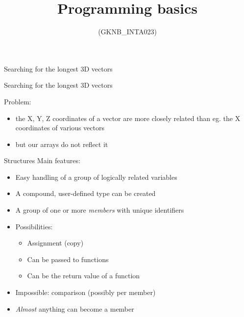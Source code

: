 \documentclass[usenames,dvipsnames,aspectratio=169]{beamer}
\title[Lecture 7.]{Programming basics}
\subtitle{(GKNB\_INTA023)}
\begin{document}
\begin{frame}[plain]
  \titlepage
\end{frame}

\begin{frame}{Searching for the longest 3D vectors}
  \begin{exampleblock}{}
    \scriptsize
    
  \end{exampleblock}
\end{frame}

\begin{frame}{Searching for the longest 3D vectors}
  \begin{exampleblock}{}
    \scriptsize
    
  \end{exampleblock}
  \vfill
  Problem:
  \begin{itemize}
    \item the X, Y, Z coordinates of a vector are more closely related than eg. the X coordinates of various vectors
    \item but our arrays do not reflect it
  \end{itemize}
\end{frame}

\begin{frame}{Structures}
  Main features:
  \begin{itemize}
    \item Easy handling of a group of logically related variables
    \item A compound, user-defined type can be created
    \item A group of one or more \emph{members} with unique identifiers
    \item Possibilities:
    \begin{itemize}
      \item Assignment (copy)
      \item Can be passed to functions
      \item Can be the return value of a function
    \end{itemize}
    \item Impossible: comparison (possibly per member)
    \item \emph{Almost} anything can become a member
  \end{itemize}
\end{frame}
\end{document}
